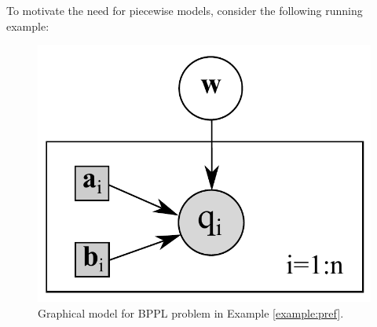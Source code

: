 To motivate the need for piecewise models, consider the following running example:
\begin{figure}%
\centering
\includegraphics[width=.29\textwidth]{pic/pref2.pdf}
\caption{\footnotesize Graphical model for BPPL problem in Example \ref{example:pref}. }
\label{fig:pref}
\end{figure}
